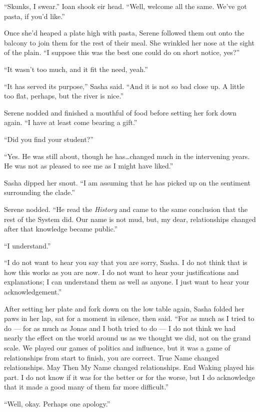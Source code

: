 ``Skunks, I swear.'' Ioan shook eir head. ``Well, welcome all the same. We've got pasta, if you'd like.''

Once she'd heaped a plate high with pasta, Serene followed them out onto the balcony to join them for the rest of their meal. She wrinkled her nose at the sight of the plain. ``I suppose this was the best one could do on short notice, yes?''

``It wasn't too much, and it fit the need, yeah.''

``It has served its purpose,'' Sasha said. ``And it is not so bad close up. A little too flat, perhaps, but the river is nice.''

Serene nodded and finished a mouthful of food before setting her fork down again. ``I have at least come bearing a gift.''

``Did you find your student?''

``Yes. He was still about, though he has\ldots changed much in the intervening years. He was not as pleased to see me as I might have liked.''

Sasha dipped her snout. ``I am assuming that he has picked up on the sentiment surrounding the clade.''

Serene nodded. ``He read the \emph{History} and came to the same conclusion that the rest of the System did. Our name is not mud, but, my dear, relationships changed after that knowledge became public.''

``I understand.''

``I do not want to hear you say that you are sorry, Sasha. I do not think that is how this works as you are now. I do not want to hear your justifications and explanations; I can understand them as well as anyone. I just want to hear your acknowledgement.''

After setting her plate and fork down on the low table again, Sasha folded her paws in her lap, sat for a moment in silence, then said. ``For as much as I tried to do — for as much as Jonas and I both tried to do — I do not think we had nearly the effect on the world around us as we thought we did, not on the grand scale. We played our games of politics and influence, but it was a game of relationships from start to finish, you are correct. True Name changed relationships. May Then My Name changed relationships. End Waking played his part. I do not know if it was for the better or for the worse, but I do acknowledge that it made a good many of them far more difficult.''

``Well, okay. Perhaps one apology.''

